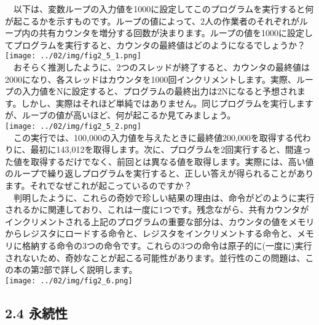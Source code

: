 　以下は、変数ループの入力値を1000に設定してこのプログラムを実行すると何が起こるかを示すものです。ループの値によって、2人の作業者のそれぞれがループ内の共有カウンタを増分する回数が決まります。ループの値を1000に設定してプログラムを実行すると、カウンタの最終値はどのようになるでしょうか？\\
\texttt{[image: ../02/img/fig2\_5\_1.png]}\\
　おそらく推測したように、2つのスレッドが終了すると、カウンタの最終値は2000になり、各スレッドはカウンタを1000回インクリメントします。実際、ループの入力値をNに設定すると、プログラムの最終出力は2Nになると予想されます。しかし、実際はそれほど単純ではありません。同じプログラムを実行しますが、ループの値が高いほど、何が起こるか見てみましょう。\\
\texttt{[image: ../02/img/fig2\_5\_2.png]}\\
　この実行では、100,000の入力値を与えたときに最終値200,000を取得する代わりに、最初に143,012を取得します。次に、プログラムを2回実行すると、間違った値を取得するだけでなく、前回とは異なる値を取得します。実際には、高い値のループで繰り返しプログラムを実行すると、正しい答えが得られることがあります。それでなぜこれが起こっているのですか？\\
　判明したように、これらの奇妙で珍しい結果の理由は、命令がどのように実行されるかに関連しており、これは一度に1つです。残念ながら、共有カウンタがインクリメントされる上記のプログラムの重要な部分は、カウンタの値をメモリからレジスタにロードする命令と、レジスタをインクリメントする命令と、メモリに格納する命令の3つの命令です。これらの3つの命令は原子的に(一度に)実行されないため、奇妙なことが起こる可能性があります。並行性のこの問題は、この本の第2部で詳しく説明します。\\
\texttt{[image: ../02/img/fig2\_6.png]}

\hypertarget{ux6c38ux7d9aux6027}{%
\subsection*{2.4 永続性}\label{ux6c38ux7d9aux6027}}

